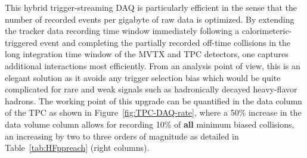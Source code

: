 This hybrid trigger-streaming DAQ is particularly efficient in the
sense that the number of recorded events per gigabyte of raw data is
optimized.  By extending the tracker data recording time window
immediately following a calorimeteric-triggered event and completing
the partially recorded off-time collisions in the long integration
time window of the MVTX and TPC detectors, one captures additional
interactions most efficiently.  From an analysis point of view, this
is an elegant solution as it avoids any trigger selection bias which
would be quite complicated for rare and weak signals such as
hadronically decayed heavy-flavor hadrons.  The working point of this
upgrade can be quantified in the data column of the TPC as shown in
Figure~\ref{fig:TPC-DAQ-rate}, where a 50\% increase in the data
volume column allows for recording 10\% of {\bf all} minimum biased
collisions, an increasing by two to three orders of magnitude as
detailed in Table~\ref{tab:HFppreach} (right columns).

 



 




